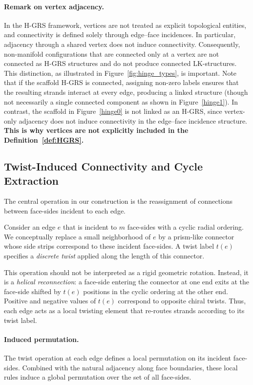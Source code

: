 \documentclass[acmtog,anonymous,review]{acmart}
\begin{document}
\paragraph{Remark on vertex adjacency.}
In the H-GRS framework, vertices are not treated as explicit topological entities, and connectivity is defined solely through edge--face incidences. In particular, adjacency through a shared vertex does not induce connectivity. Consequently, non-manifold configurations that are connected only at a vertex are not connected as H-GRS structures and do not produce connected LK-structures. This distinction, as illustrated in Figure~\ref{fig:hinge_types}, is important. Note that if the scaffold H-GRS is connected, assigning non-zero labels ensures that the resulting strands interact at every edge, producing a linked structure (though not necessarily a single connected component as shown in Figure~\ref{hinge1}). In contrast, the scaffold in Figure~\ref{hinge0} is
not linked as an H-GRS, since vertex-only adjacency does not induce connectivity in the edge--face incidence structure. \textbf{This is why vertices are not explicitly included in the Definition~\ref{def:HGRS}.} 

\subsection{Twist-Induced Connectivity and Cycle Extraction}

The central operation in our construction is the reassignment of connections between face-sides incident to each edge.

Consider an edge $e$ that is incident to $m$ face-sides with a cyclic radial ordering. We conceptually replace a small neighborhood of $e$ by a prism-like connector whose side strips correspond to these incident face-sides. A twist label $t(e)$ specifies a \emph{discrete twist} applied along the length of this connector.

This operation should not be interpreted as a rigid geometric rotation. Instead, it is a \emph{helical reconnection}: a face-side entering the connector at one end exits at the face-side shifted by $t(e)$ positions in the cyclic ordering at the other end. Positive and negative values of $t(e)$ correspond to opposite chiral twists. Thus, each edge acts as a local twisting element that re-routes strands according to its twist label.

\paragraph{Induced permutation.}
The twist operation at each edge defines a local permutation on its incident face-sides. Combined with the natural adjacency along face boundaries, these local rules induce a global permutation over the set of all face-sides.
\end{document}
